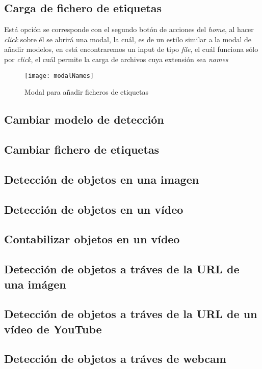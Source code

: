 \subsection{Carga de fichero de etiquetas}
Está opción se corresponde con el segundo botón de acciones del \textit{home}, al hacer \textit{click} sobre él se abrirá una modal, la cuál, es de un estilo similar a la modal de añadir modelos, en está encontraremos un input de tipo \textit{file}, el cuál funciona sólo por \textit{click}, el cuál permite la carga de archivos cuya extensión sea \textit{names}
\begin{figure}[!h]
    \centering
    \texttt{[image: modalNames]}
    \caption{Modal para añadir ficheros de etiquetas}\label{fig:modalNames}
\end{figure}
\subsection{Cambiar modelo de detección}
\subsection{Cambiar fichero de etiquetas}
\subsection{Detección de objetos en una imagen}
\subsection{Detección de objetos en un vídeo}
\subsection{Contabilizar objetos en un vídeo}
\subsection{Detección de objetos a tráves de la URL de una imágen}
\subsection{Detección de objetos a tráves de la URL de un vídeo de YouTube}
\subsection{Detección de objetos a tráves de webcam}
